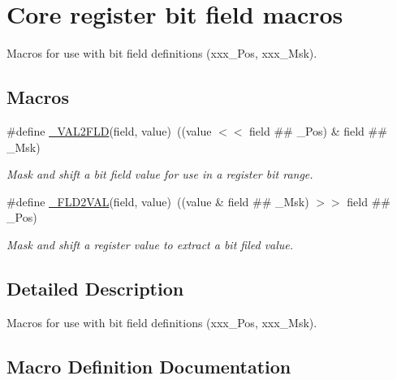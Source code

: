 \hypertarget{group__CMSIS__core__bitfield}{}\section{Core register bit field macros}
\label{group__CMSIS__core__bitfield}


Macros for use with bit field definitions (xxx\+\_\+\+Pos, xxx\+\_\+\+Msk).  


\subsection*{Macros}
\begin{DoxyCompactItemize}
\item 
\#define \mbox{\hyperlink{group__CMSIS__core__bitfield_ga286e3b913dbd236c7f48ea70c8821f4e}{\+\_\+\+V\+A\+L2\+F\+LD}}(field,  value)~((value $<$$<$ field \#\# \+\_\+\+Pos) \& field \#\# \+\_\+\+Msk)
\begin{DoxyCompactList}\small\item\em Mask and shift a bit field value for use in a register bit range. \end{DoxyCompactList}\item 
\#define \mbox{\hyperlink{group__CMSIS__core__bitfield_ga139b6e261c981f014f386927ca4a8444}{\+\_\+\+F\+L\+D2\+V\+AL}}(field,  value)~((value \& field \#\# \+\_\+\+Msk) $>$$>$ field \#\# \+\_\+\+Pos)
\begin{DoxyCompactList}\small\item\em Mask and shift a register value to extract a bit filed value. \end{DoxyCompactList}\end{DoxyCompactItemize}


\subsection{Detailed Description}
Macros for use with bit field definitions (xxx\+\_\+\+Pos, xxx\+\_\+\+Msk). 



\subsection{Macro Definition Documentation}
\mbox{\label{group__CMSIS__core__bitfield_ga139b6e261c981f014f386927ca4a8444}} 
